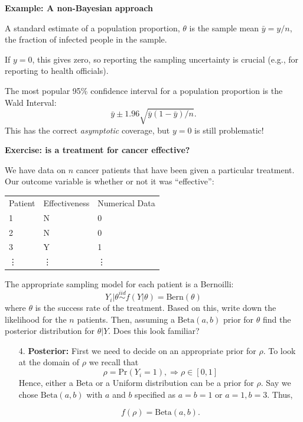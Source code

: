 \documentclass[12pt,xcolor=svgnames]{beamer}
\newcommand{\rd}{\color{red}}
\newcommand{\bl}{\color{blue}}
\newcommand{\theme}{\color{FireBrick}}
\newcommand{\fb}{\color{FireBrick}}
\newcommand{\mr}[1]{\mathrm{#1}}
\newcommand{\sk}{\vspace{.4cm}}
\newcommand{\nochap}{\vspace{0.5cm}}
\newcommand{\chap}[1]{{\theme \Large \bf #1} \sk}
\newcommand{\pr}{\text{Pr}}
\begin{document}
\begin{frame}
\chap{Example: A non-Bayesian approach}

A standard estimate of a population proportion, $\theta$ is the sample mean  $\bar{y} = y/n$, the fraction of infected people in the sample. 

\sk
If $y=0$, this gives zero, so reporting the sampling uncertainty is crucial (e.g., for reporting to health officials). 

\sk
The most popular 95\% confidence interval for a population proportion is the {\bl Wald Interval}:
\begin{equation*}
\bar{y} \pm 1.96 \sqrt{\bar{y}(1-\bar{y})/n}.
\end{equation*}
This has the correct {\it asymptotic} coverage, but {\rd $y=0$ is still problematic}!

\end{frame}


\begin{frame}
\nochap
{\bf \fb Exercise: is a treatment for cancer effective?}\\

{\footnotesize
We have data on $n$ cancer patients that have been given a particular treatment. Our outcome variable is whether or not it was ``effective'':
\begin{center}
 \begin{tabular}{lll}
Patient & Effectiveness & Numerical Data \\
1& N& 0\\
2&N&0\\
3&Y&1\\
\vdots &\vdots &\vdots \\
\end{tabular}
\end{center}
The appropriate sampling model for each patient is a Bernoilli:
$$Y_i|\theta  \stackrel{iid}{\sim} f(Y|\theta) = \text{Bern}(\theta)$$ 
where $\theta$ is the success rate of the treatment. Based on this, write down the likelihood for the $n$ patients. Then, assuming a $\mr{Beta}(a,b)$ prior for $\theta$ find the posterior distribution for $\theta|Y$. Does this look familiar?
}

\end{frame}


\iffalse
\begin{frame}
\begin{enumerate}



\item[4. ] {\bf Posterior:}
First we need to decide on an appropriate  {\bl prior} for $\rho.$ To look at the domain of $\rho$ we recall that 
\begin{equation*}
\rho = \pr(Y_i = 1),\Rightarrow \rho \in [0, 1] 
\end{equation*}
Hence, either a {\bl Beta} or a {\bl Uniform} distribution can be a prior for $\rho.$ Say we chose $\text{Beta}(a,b)$ with $a$ and $b$ specified as $a=b=1$ or $a=1,b=3$. Thus,

$$ f(\rho) = \text{Beta}(a,b).$$
\end{enumerate}
\end{frame}
\end{document}
